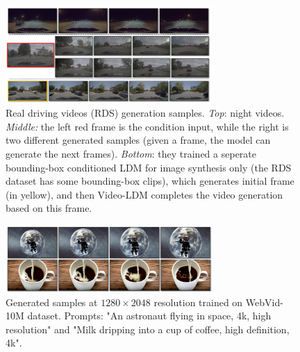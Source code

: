 \begin{figure}
    \centering
    \includegraphics[width=0.7\textwidth]{images/video_ldm/rds.png}
    \caption{Real driving videos (RDS) generation samples. \textit{Top}: night videos. \textit{Middle:} the left red frame is the condition input, while the right is two different generated samples (given a frame, the model can generate the next frames). \textit{Bottom}: they trained a seperate bounding-box conditioned LDM for image synthesis only (the RDS dataset has some bounding-box clips), which generates initial frame (in yellow), and then Video-LDM completes the video generation based on this frame.}
\end{figure}

\begin{figure}
    \centering
    \includegraphics[width=0.7\textwidth]{images/video_ldm/webvid_samples.png}
    \caption{Generated samples at $1280\times 2048$ resolution trained on WebVid-10M dataset. Prompts: "An astronaut flying in space, 4k, high resolution" and "Milk dripping into a cup of coffee, high definition, 4k".}
\end{figure}

